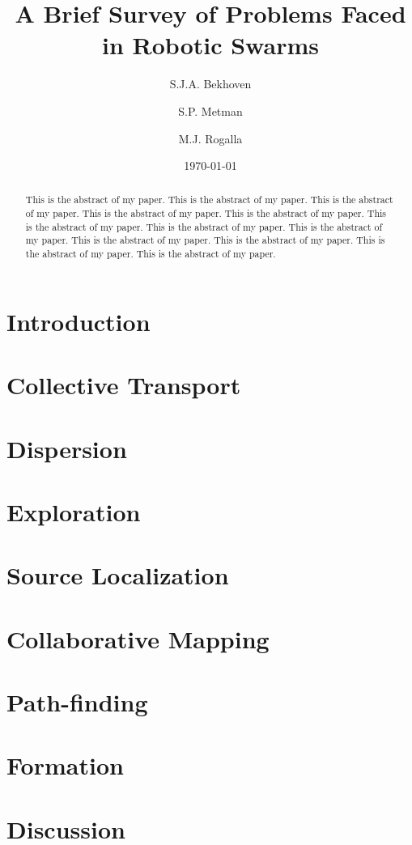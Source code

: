 \documentclass[a4paper]{article}
\title{A Brief Survey of Problems Faced \\ in Robotic Swarms}
\author{S.J.A. Bekhoven  \and
    S.P. Metman \and
    M.J. Rogalla}
\date{\today}
\begin{document}
\maketitle
\thispagestyle{empty}

\begin{abstract}
This is the abstract of my paper.
This is the abstract of my paper.
This is the abstract of my paper.
This is the abstract of my paper.
This is the abstract of my paper.
This is the abstract of my paper.
This is the abstract of my paper.
This is the abstract of my paper.
This is the abstract of my paper.
This is the abstract of my paper.
This is the abstract of my paper.
This is the abstract of my paper.
\end{abstract}


\section{Introduction}
  

\section{Collective Transport}
  
  
\section{Dispersion}
  
 
 \section{Exploration}
  
 
 \section{Source Localization}
  
 
 \section{Collaborative Mapping}
  
 
 \section{Path-finding}
  
 
 \section{Formation}
  

\section{Discussion}
  




\end{document}
